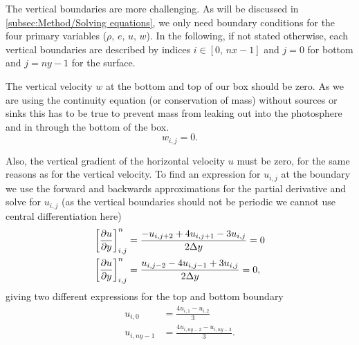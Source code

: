 \documentclass[11pt,a4paper,twocolumn,titlepage]{article}
\newcommand{\disc}[1]    %
{
\ensuremath
\qty[#1]_{i,j}^{n}
}
\begin{document}
The vertical boundaries are more challenging. As will be discussed in \cref{subsec:Method/Solving equations}, we only need boundary conditions for the four primary variables ($\rho,\,e,\,u,\,w$). In the following, if not stated otherwise, each vertical boundaries are described by indices $i\in[0,\,nx-1]$ and $j = 0$ for bottom and $j=ny-1$ for the surface.

The vertical velocity $w$ at the bottom and top of our box should be zero. As we are using the continuity equation (or conservation of mass) without sources or sinks this has to be true to prevent mass from leaking out into the photosphere and in through the bottom of the box.
\begin{equation}
w_{i,j} = 0.
\label{eq:Boundary w}
\end{equation}

Also, the vertical gradient of the horizontal velocity $u$ must be zero, for the same reasons as for the vertical velocity. To find an expression for $u_{i,j}$ at the boundary we use the forward and backwards approximations for the partial derivative and solve for $u_{i,j}$ (as the vertical boundaries should not be periodic we cannot use central differentiation here)
\begin{align*}
\disc{\pdv{u}{y}} &= \frac{-u_{i,j+2}+4u_{i,j+1}-3u_{i,j}}{2\Delta y}=0
\\
\disc{\pdv{u}{y}} &= \frac{u_{i,j-2}-4u_{i,j-1}+3u_{i,j}}{2\Delta y}=0,
\end{align*}
giving two different expressions for the top and bottom boundary
\begin{equation}
\begin{aligned}
u_{i,0} &= \frac{4u_{i,1}-u_{i,2}}{3}
\\
u_{i,ny-1} &= \frac{4u_{i,ny-2}-u_{i,ny-3}}{3}.
\end{aligned}
\label{eq:Boundary u}
\end{equation}
\end{document}
